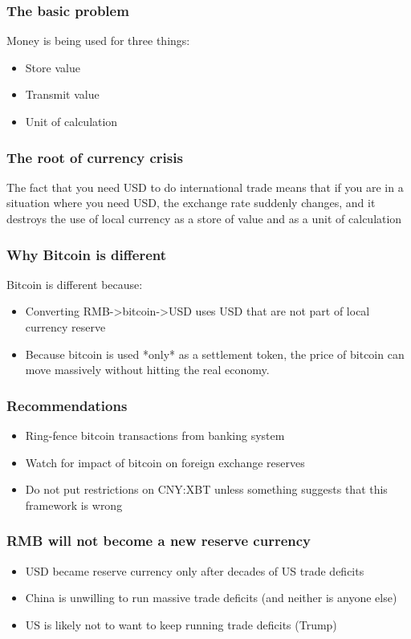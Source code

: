 \documentclass{beamer}
\begin{document}
\begin{frame}
  \frametitle{The basic problem}
  Money is being used for three things:
  \begin{itemize}
  \item Store value
  \item Transmit value
  \item Unit of calculation
  \end{itemize}
\end{frame}
\begin{frame}
  \frametitle{The root of currency crisis}
The fact that you need USD to do international trade means that if you
are in a situation where you need USD, the exchange rate suddenly
changes, and it destroys the use of local currency as a store of
value and as a unit of calculation
\end{frame}
\begin{frame}
  \frametitle{Why Bitcoin is different}
  Bitcoin is different because:
  \begin{itemize}
  \item Converting RMB->bitcoin->USD uses USD that are not part of
    local currency reserve
  \item Because bitcoin is used *only* as a settlement token, the
    price of bitcoin can move massively without hitting the real
    economy.
  \end{itemize}
\end{frame}
\begin{frame}
  \frametitle{Recommendations}
  \begin{itemize}
  \item Ring-fence bitcoin transactions from banking system
  \item Watch for impact of bitcoin on foreign exchange reserves
    \item Do not put restrictions on CNY:XBT unless something suggests
      that this framework is wrong
  \end{itemize}
\end{frame}
\begin{frame}
  \frametitle{RMB will not become a new reserve currency}
  \begin{itemize}
    \item USD became reserve currency only after decades of US trade
      deficits
    \item China is unwilling to run massive trade deficits (and
      neither is anyone else)
    \item US is likely not to want to keep running trade deficits
      (Trump)
  \end{itemize}
\end{frame}
\end{document}
